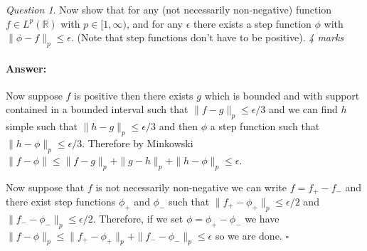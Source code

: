 \documentclass[11pt]{article}
\theoremstyle{definition}
\theoremstyle{remark}
\newtheorem{q}[thm]{Question}
\newenvironment{ans}{\paragraph{Answer:}}{\hfill$\square$ \vspace{20pt}}
\begin{document}
\begin{q}
Now show that for any (not necessarily non-negative) function $f \in L^p(\mathbb{R})$ with $p \in [1, \infty)$, and for any $\epsilon$ there exists a step function $\phi$ with $\|\phi  - f\|_p \leq \epsilon$. (Note that step functions don't have to be positive). \emph{4 marks}
\end{q}
\begin{ans}
Now suppose $f$ is positive then there exists $g$ which is bounded and with support contained in a bounded interval such that $\|f-g\|_p \leq \epsilon/3$ and we can find $h$ simple such that $\|h-g\|_p \leq \epsilon/3$ and then $\phi$ a step function such that $\|h-\phi\|_p \leq \epsilon/3$. Therefore by Minkowski $\|f-\phi\| \leq \|f-g\|_p + \|g-h\|_p + \|h - \phi\|_p \leq \epsilon$. 

Now suppose that $f$ is not necessarily non-negative we can write $f = f_+ - f_-$ and there exist step functions $\phi_+$ and $\phi_-$ such that $\|f_+ - \phi_+\|_p \leq \epsilon/2$ and $\|f_- - \phi_-\|_p \leq \epsilon/2$. Therefore, if we set $\phi = \phi_+ - \phi_-$ we have $\|f-\phi\|_p \leq \|f_+ - \phi_+\|_p + \| f_- - \phi_-\|_p \leq \epsilon$ so we are done.
\end{ans}
\end{document}
